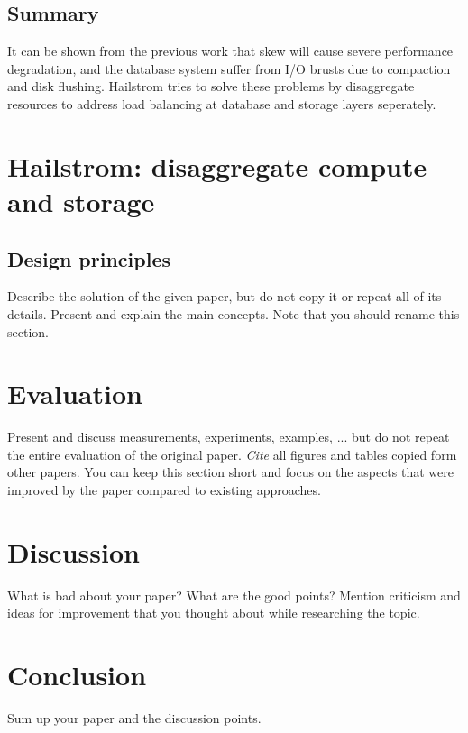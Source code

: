 \documentclass[a4paper,10pt,twoside]{article}
\begin{document}
\subsection{Summary}
It can be shown from the previous work that skew will cause severe performance degradation, and the database system suffer from I/O brusts due to compaction and disk flushing.
Hailstrom tries to solve these problems by disaggregate resources to address load balancing at database and storage layers seperately.

\section{Hailstrom: disaggregate compute and storage}

\subsection{Design principles}


Describe the solution of the given paper, but do not copy it or repeat all of its details.
Present and explain the main concepts. 
Note that you should rename this section. 

\section{Evaluation}

Present and discuss measurements, experiments, examples, ... but do not repeat the entire evaluation of the original paper.
\emph{Cite} all figures and tables copied form other papers.
You can keep this section short and focus on the aspects that were improved by the paper compared to existing approaches.

\section{Discussion}

What is bad about your paper? 
What are the good points? 
Mention criticism and ideas for improvement that you thought about while researching the topic.

\section{Conclusion}

Sum up your paper and the discussion points.


 
\end{document}
